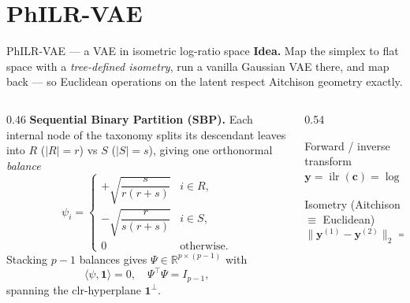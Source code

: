\documentclass[aspectratio=169,11pt]{beamer}
\newcommand{\R}{\mathbb R}
\newcommand{\ilr}{\operatorname{ilr}}
\newcommand{\softmax}{\operatorname{softmax}}
\begin{document}
\section{PhILR-VAE}
\begin{frame}{PhILR-VAE --- a VAE in isometric log-ratio space}
  \textbf{Idea.} Map the simplex to flat space with a \emph{tree-defined isometry},
  run a vanilla Gaussian VAE there, and map back --- so Euclidean operations on the
  latent respect Aitchison geometry exactly.
  \begin{columns}[T]
    \begin{column}{0.46\textwidth}
      \textbf{Sequential Binary Partition (SBP).} Each internal node of the
      taxonomy splits its descendant leaves into $R$ ($|R|=r$) vs $S$ ($|S|=s$),
      giving one orthonormal \emph{balance}
      \[
        \psi_i=
        \begin{cases}
          +\sqrt{\dfrac{s}{r(r+s)}} & i\in R,\\[6pt]
          -\sqrt{\dfrac{r}{s(r+s)}} & i\in S,\\[2pt]
          0 & \text{otherwise.}
        \end{cases}
      \]
      Stacking $p-1$ balances gives $\Psi\in\R^{p\times(p-1)}$ with
      \[
        \langle\psi,\mathbf 1\rangle=0,\quad \Psi^\top\Psi=I_{p-1},
      \]
      spanning the clr-hyperplane $\mathbf 1^\perp$.
    \end{column}
    \begin{column}{0.54\textwidth}
      \centering

      \vspace{0.4em}
      \begin{block}{Forward / inverse transform}
        \[
          \mathbf y=\ilr(\mathbf c)=\log(\mathbf c)\,\Psi\in\R^{p-1},\quad
          \hat{\mathbf c}=\softmax(\hat{\mathbf y}\,\Psi^\top).
        \]
      \end{block}
      \begin{exampleblock}{Isometry (Aitchison $\equiv$ Euclidean)}
        \[
          \big\|\mathbf y^{(1)}-\mathbf y^{(2)}\big\|_2
          = d_A\big(\mathbf c^{(1)},\mathbf c^{(2)}\big).
        \]
      \end{exampleblock}
    \end{column}
  \end{columns}
\end{frame}
\end{document}
